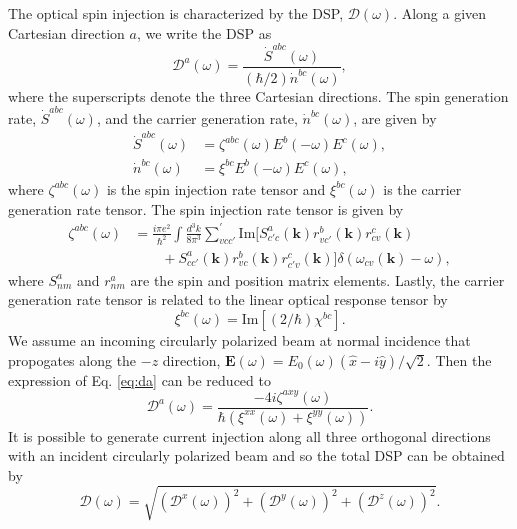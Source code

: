 \documentclass[pss]{wiley2sp} %
\begin{document}
The optical spin injection is characterized by the DSP, $\boldsymbol{\mathcal{D}}(\omega)$.
Along a given Cartesian direction $a$, we write the DSP \cite{cabellosPRB09} as
\begin{equation}\label{eq:da}
\mathcal{D}^{a}(\omega)=
\frac{\dot{S}^{abc}(\omega)}{(\hbar/2)\dot{n}^{bc}(\omega)},
\end{equation}
where the superscripts denote the three Cartesian directions. The spin
generation rate, $\dot{S}^{abc}(\omega)$, and the carrier generation rate,
$\dot{n}^{bc}(\omega)$, are given by
\begin{align*}
\dot{S}^{abc}(\omega)&= 
\zeta^{abc}(\omega)E^{b}(-\omega)E^{c}(\omega),\nonumber\\
\dot{n}^{bc}(\omega)&= 
\xi^{bc}E^{b}(-\omega)E^{c}(\omega),
\end{align*}
where $\zeta^{abc}(\omega)$ is the spin injection rate tensor and
$\xi^{bc}(\omega)$ is the carrier generation rate tensor. The spin injection
rate tensor is given by
\begin{align*}\label{eq:zeta}
\zeta^{abc}(\omega) &= \frac{i\pi e^{2}}{\hbar^{2}}\int\frac{d^{3}k}{8\pi^{3}}
\sum_{vcc'}^{\prime}\text{Im}\bigl[S^{a}_{c'c}(\textbf{k})
r^{b}_{vc'}(\textbf{k})r^{c}_{cv}(\textbf{k})\nonumber\\
&\qquad+S^{a}_{cc'}(\textbf{k})
r^{b}_{vc}(\textbf{k})r^{c}_{c'v}(\textbf{k})\bigr]
\delta(\omega_{cv}(\textbf{k})-\omega),
\end{align*}
where $S^{a}_{nm}$ and $r^{a}_{nm}$ are the spin and position matrix elements.
Lastly, the carrier generation rate tensor is related to the linear optical
response tensor by
\begin{equation*}
\xi^{bc}(\omega)=\mathrm{Im}[(2/\hbar)\chi^{bc}].
\end{equation*}
We assume an incoming circularly polarized beam at normal incidence that
propogates along the $-z$ direction, $\mathbf{E}(\omega) =
E_{0}(\omega)(\hat{x} - i\hat{y})/\sqrt{2}$. Then the expression of Eq.
\eqref{eq:da} can be reduced to \cite{arzatePRB14}
\begin{equation}\label{eq:D^i}
\mathcal{D}^{a}(\omega) = 
\frac{-4i\zeta^{axy}(\omega)}
    {\hbar\left(\xi^{xx}(\omega) + \xi^{yy}(\omega)\right)}.
\end{equation}
It is possible to generate current injection along all three orthogonal
directions with an incident circularly polarized beam and so the total DSP can
be obtained by \cite{arzatePRB14}
\begin{equation}\label{eq:dsptotal}
\mathcal{D}(\omega) =
\sqrt{(\mathcal{D}^{x}(\omega))^{2} + 
      (\mathcal{D}^{y}(\omega))^{2} +
      (\mathcal{D}^{z}(\omega))^{2}
      }.
\end{equation}
\end{document}
